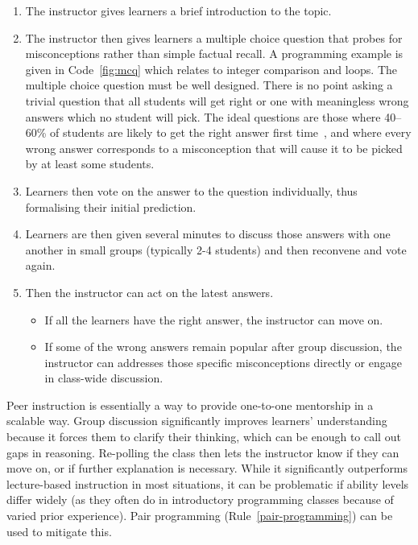 \documentclass[10pt,letterpaper]{article}
\newcommand{\ruleref}[1]{Rule~\ref{#1}}
\begin{document}
\begin{enumerate}

\item The instructor gives learners a brief introduction to the topic.

\item The instructor then gives learners a multiple choice question
  that probes for misconceptions rather than simple factual recall.
  A programming example is given in Code~\ref{fig:mcq}
  which relates to integer comparison and loops.  The multiple choice question must be well designed.
  There is no point asking a trivial question that all students will get right or one with meaningless wrong answers which no student will pick.
  The ideal questions are those where 40--60\% of students are likely to get the right answer first time~\cite[p23]{nrc-reaching}, and where every wrong answer corresponds to a misconception that will cause it to be picked by at least some students.

\item Learners then vote on the answer to the question individually, thus formalising their initial prediction.

\item Learners are then given several minutes to discuss those answers with one another
    in small groups (typically 2-4 students)
    and then reconvene and vote again.
\item Then the instructor can act on the latest answers.
  \begin{itemize}
  \item If all the learners have the right answer, the instructor can move on.
  \item If some of the wrong answers remain popular after group discussion,
    the instructor can addresses those specific misconceptions directly or engage in class-wide discussion.
  \end{itemize}

\end{enumerate}

Peer instruction is essentially
a way to provide one-to-one mentorship in a scalable way.
Group discussion significantly improves learners' understanding
because it forces them to clarify their thinking,
which can be enough to call out gaps in reasoning.
Re-polling the class then lets the instructor know if they can move on,
or if further explanation is necessary.
While it significantly outperforms lecture-based instruction in most situations,
it can be problematic if ability levels differ widely
(as they often do in introductory programming classes
because of varied prior experience).
Pair programming (\ruleref{pair-programming}) can be used to mitigate this.
\end{document}
